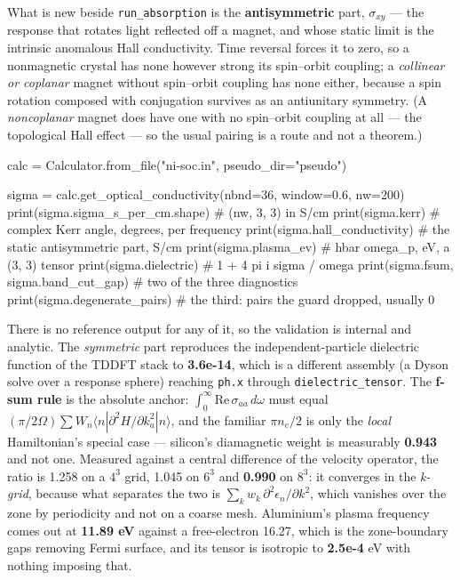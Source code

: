 \documentclass[11pt,a4paper]{article}
\newcommand{\code}[1]{\texttt{\small #1}}
\begin{document}
What is new beside \code{run\_absorption} is the \textbf{antisymmetric} part,
$\sigma_{xy}$ --- the response that rotates light reflected off a magnet, and
whose static limit is the intrinsic anomalous Hall conductivity. Time reversal
forces it to zero, so a nonmagnetic crystal has none however strong its
spin--orbit coupling; a \emph{collinear or coplanar} magnet without spin--orbit
coupling has none either, because a spin rotation composed with conjugation
survives as an antiunitary symmetry. (A \emph{noncoplanar} magnet does have
one with no spin--orbit coupling at all --- the topological Hall effect --- so
the usual pairing is a route and not a theorem.)

\begin{pycode}
calc = Calculator.from_file("ni-soc.in", pseudo_dir="pseudo")

sigma = calc.get_optical_conductivity(nbnd=36, window=0.6, nw=200)
print(sigma.sigma_s_per_cm.shape)   # (nw, 3, 3) in S/cm
print(sigma.kerr)                   # complex Kerr angle, degrees, per frequency
print(sigma.hall_conductivity)      # the static antisymmetric part, S/cm
print(sigma.plasma_ev)              # hbar omega_p, eV, a (3, 3) tensor
print(sigma.dielectric)             # 1 + 4 pi i sigma / omega
print(sigma.fsum, sigma.band_cut_gap)   # two of the three diagnostics
print(sigma.degenerate_pairs)       # the third: pairs the guard dropped, usually 0
\end{pycode}

There is no reference output for any of it, so the validation is internal and
analytic. The \emph{symmetric} part reproduces the independent-particle
dielectric function of the TDDFT stack to \textbf{3.6e-14}, which is a
different assembly (a Dyson solve over a response sphere) reaching \code{ph.x}
through \code{dielectric\_tensor}. The \textbf{f-sum rule} is the absolute
anchor: $\int_0^\infty\mathrm{Re}\,\sigma_{aa}\,d\omega$ must equal
$(\pi/2\Omega)\sum W_n\langle n|\partial^2H/\partial k_a^2|n\rangle$, and the
familiar $\pi n_e/2$ is only the \emph{local} Hamiltonian's special case ---
silicon's diamagnetic weight is measurably \textbf{0.943} and not one. Measured
against a central difference of the velocity operator, the ratio is 1.258 on a
$4^3$ grid, 1.045 on $6^3$ and \textbf{0.990} on $8^3$: it converges in the
\emph{k-grid}, because what separates the two is $\sum_k w_k\,
\partial^2\epsilon_n/\partial k^2$, which vanishes over the zone by periodicity
and not on a coarse mesh. Aluminium's plasma frequency comes out at
\textbf{11.89 eV} against a free-electron 16.27, which is the zone-boundary gaps
removing Fermi surface, and its tensor is isotropic to \textbf{2.5e-4} eV with
nothing imposing that.
\end{document}
